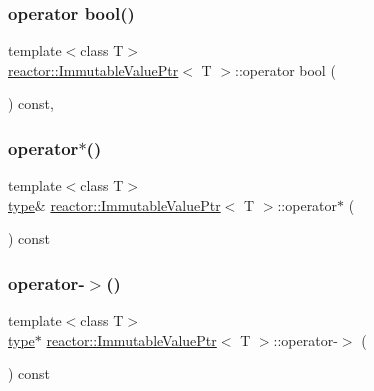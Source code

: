 \subsubsection{\texorpdfstring{operator bool()}{operator bool()}}
{\footnotesize\ttfamily template$<$class T$>$ \\
\hyperlink{classreactor_1_1ImmutableValuePtr}{reactor\+::\+Immutable\+Value\+Ptr}$<$ T $>$\+::operator bool (\begin{DoxyParamCaption}{ }\end{DoxyParamCaption}) const\hspace{0.3cm}{\ttfamily [inline]}, {\ttfamily [explicit]}}

\mbox{\label{classreactor_1_1ImmutableValuePtr_a1cbbf368f886f35c63604424f9b3b393}} 
\subsubsection{\texorpdfstring{operator$\ast$()}{operator*()}}
{\footnotesize\ttfamily template$<$class T$>$ \\
\hyperlink{classreactor_1_1ImmutableValuePtr_a88dbe82ff9b732b87e054ee37254bdfa}{type}\& \hyperlink{classreactor_1_1ImmutableValuePtr}{reactor\+::\+Immutable\+Value\+Ptr}$<$ T $>$\+::operator$\ast$ (\begin{DoxyParamCaption}{ }\end{DoxyParamCaption}) const\hspace{0.3cm}{\ttfamily [inline]}}

\mbox{\label{classreactor_1_1ImmutableValuePtr_af547b7a43033f0fbe383665c10335173}} 
\subsubsection{\texorpdfstring{operator-\/$>$()}{operator->()}}
{\footnotesize\ttfamily template$<$class T$>$ \\
\hyperlink{classreactor_1_1ImmutableValuePtr_a88dbe82ff9b732b87e054ee37254bdfa}{type}$\ast$ \hyperlink{classreactor_1_1ImmutableValuePtr}{reactor\+::\+Immutable\+Value\+Ptr}$<$ T $>$\+::operator-\/$>$ (\begin{DoxyParamCaption}{ }\end{DoxyParamCaption}) const\hspace{0.3cm}{\ttfamily [inline]}}


